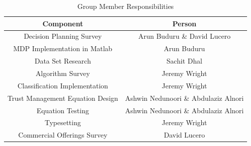 \begin{table}[h!]
    \centering
    \begin{tabular}{c | c }
        \hline
        Component	& Person \\
        \hline \hline
        Decision Planning Survey      & Arun Buduru \& David Lucero\\
        MDP Implementation in Matlab  & Arun Buduru  \\
                        \hline
        Data Set Research    &   Sachit Dhal\\
        Algorithm Survey     &   Jeremy Wright \\
        Classification Implementation &  Jeremy Wright \\
                        \hline
        Trust Management Equation Design &   Ashwin Nedunoori \& Abdulaziz Alnori\\
        Equation Testing &   Ashwin Nedunoori \& Abdulaziz Alnori\\
                        \hline
        Typesetting  & Jeremy Wright\\
        \hline
        Commercial Offerings Survey  & David Lucero
    \end{tabular}
    \caption{Group Member Responsibilities}
\end{table}
